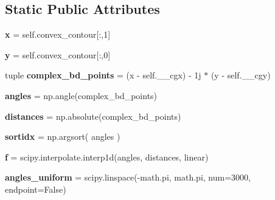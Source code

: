 \subsection*{Static Public Attributes}
\begin{DoxyCompactItemize}
\item 
\mbox{\label{class_boundary_1_1_boundary_aac3ccec2433969a71880cabdefb3fa4f}} 
{\bfseries x} = self.\+convex\+\_\+contour\mbox{[}\+:,1\mbox{]}
\item 
\mbox{\label{class_boundary_1_1_boundary_a6b54b6d745fb58dad82920224645ba81}} 
{\bfseries y} = self.\+convex\+\_\+contour\mbox{[}\+:,0\mbox{]}
\item 
\mbox{\label{class_boundary_1_1_boundary_ab90f819ab950e154383eedc61c33219a}} 
tuple {\bfseries complex\+\_\+bd\+\_\+points} = (x -\/ self.\+\_\+\+\_\+cgx) -\/ 1j $\ast$ (y -\/ self.\+\_\+\+\_\+cgy)
\item 
\mbox{\label{class_boundary_1_1_boundary_a8a6f957c7a8e900693847b8f2845ac41}} 
{\bfseries angles} = np.\+angle(complex\+\_\+bd\+\_\+points)
\item 
\mbox{\label{class_boundary_1_1_boundary_a242d5bd047c612e9b28e83f7fff49309}} 
{\bfseries distances} = np.\+absolute(complex\+\_\+bd\+\_\+points)
\item 
\mbox{\label{class_boundary_1_1_boundary_a998e8fd477dfac6801356bb47dde3131}} 
{\bfseries sortidx} = np.\+argsort( angles )
\item 
\mbox{\label{class_boundary_1_1_boundary_a63a5b93b7d06fd5f85c253da2c98b0cb}} 
{\bfseries f} = scipy.\+interpolate.\+interp1d(angles, distances, \textquotesingle{}linear\textquotesingle{})
\item 
\mbox{\label{class_boundary_1_1_boundary_afa66bbf2de03b10b81b698962f5ca07f}} 
{\bfseries angles\+\_\+uniform} = scipy.\+linspace(-\/math.\+pi, math.\+pi, num=3000, endpoint=False)
\item 
\mbox{\label{class_boundary_1_1_boundary_a121958962fd71f8befc3d0ade6d658e0}} 

\end{DoxyCompactItemize}
